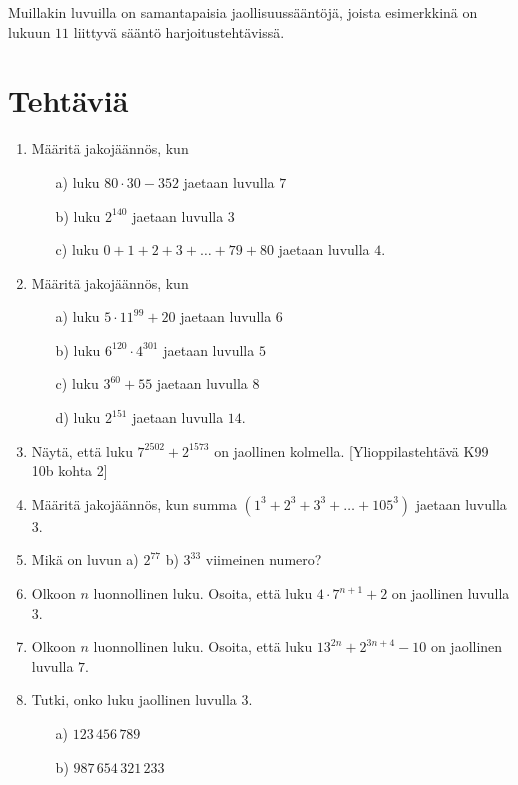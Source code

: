 Muillakin luvuilla on samantapaisia jaollisuussääntöjä, joista esimerkkinä on lukuun $11$ liittyvä sääntö harjoitustehtävissä.

\newpage


\section*{Tehtäviä}

\begin{enumerate}

\item Määritä jakojäännös, kun
\begin{itemize}
\item[a)] luku $80 \cdot 30 - 352$ jaetaan luvulla $7$
\item[b)] luku $2^{140}$ jaetaan luvulla $3$
\item[c)] luku $0+1+2+3+ \ldots + 79 + 80$ jaetaan luvulla $4$.
\end{itemize}

\item Määritä jakojäännös, kun
\begin{itemize}
\item[a)] luku $5 \cdot 11^{99} + 20$ jaetaan luvulla $6$
\item[b)] luku $6^{120} \cdot 4^{301}$ jaetaan luvulla $5$
\item[c)] luku $3^{60} + 55$ jaetaan luvulla $8$
\item[d)] luku $2^{151}$ jaetaan luvulla $14$.
\end{itemize}

\item
Näytä, että luku $7^{2502} + 2^{1573}$ on jaollinen kolmella. [Ylioppilastehtävä K99 10b kohta 2]

\item Määritä jakojäännös, kun summa $(1^3 + 2^3 + 3^3 + \ldots + 105^3)$ jaetaan luvulla $3$.

\item Mikä on luvun a) $2^{77}$ b) $3^{33}$ viimeinen numero?

\item Olkoon $n$ luonnollinen luku. Osoita, että luku $4\cdot 7^{n+1}+2$ on jaollinen luvulla $3$.

\item Olkoon $n$ luonnollinen luku. Osoita, että luku $13^{2n} + 2^{3n+4} - 10$ on jaollinen luvulla $7$.

\item
Tutki, onko luku jaollinen luvulla $3$.
\begin{itemize}
\item[a)] $123\, 456\, 789$
\item[b)] $987\, 654\, 321\, 233$
\end{itemize}


\end{enumerate}
